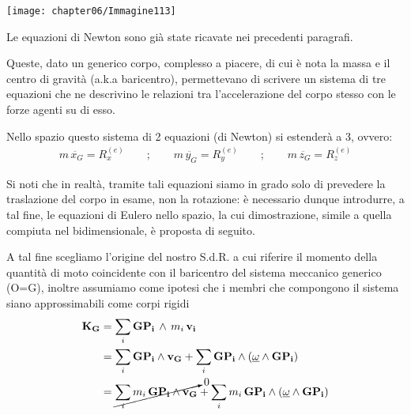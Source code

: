 		\begin{minipage}{.5\textwidth}
\centering
\texttt{[image: chapter06/Immagine113]}
\end{minipage}
\hfill
\begin{minipage}{.5\textwidth}

Le equazioni di Newton sono già state ricavate nei precedenti paragrafi.

Queste, dato un generico corpo, complesso a piacere, di cui è nota la massa e il centro di gravità (a.k.a baricentro), permettevano di scrivere un sistema di tre equazioni che ne descrivino le relazioni tra l'accelerazione del corpo stesso con le forze agenti su di esso.

Nello spazio questo sistema di 2 equazioni (di Newton) si estenderà a 3, ovvero:
\begin{gather*}
m\,\ddot{x_G} = R_x^{(e)}\qquad;\qquad m\,\ddot{y_G} = R_y^{(e)}\qquad;\qquad m\,\ddot{z_G} = R_z^{(e)} 
\end{gather*}
\end{minipage}

Si noti che in realtà, tramite tali equazioni siamo in grado solo di prevedere la traslazione del corpo in esame, non la rotazione: è necessario dunque introdurre, a tal fine, le equazioni di Eulero nello spazio, la cui dimostrazione, simile a quella compiuta nel bidimensionale, è proposta di seguito.

A tal fine scegliamo l'origine del nostro S.d.R. a cui riferire il momento della quantità di moto coincidente con il baricentro del sistema meccanico generico (O=G), inoltre assumiamo come ipotesi che i membri che compongono il sistema siano approssimabili come corpi rigidi
\begin{align*}
\mathbf{K_G} &= \sum_i \mathbf{GP_i}\,\wedge\,m_i\,\mathbf{v_i}\\
&= \sum_i \mathbf{GP_i}\wedge\mathbf{v_G} + \sum_i \mathbf{GP_i}\wedge (\underline{\omega}\wedge \mathbf{GP_i})\\
&= \cancelto{0}{\sum_i m_i\,\mathbf{GP_i}\wedge \mathbf{v_G}} + \sum_i m_i\,\mathbf{GP_i}\wedge (\underline{\omega}\wedge \mathbf{GP_i})
\end{align*}

